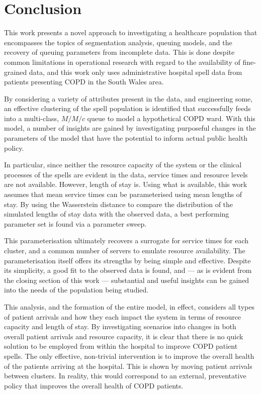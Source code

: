 \section{Conclusion}\label{sec:conclusion}

This work presents a novel approach to investigating a healthcare population
that encompasses the topics of segmentation analysis, queuing models, and the
recovery of queuing parameters from incomplete data. This is done despite common
limitations in operational research with regard to the availability of
fine-grained data, and this work only uses administrative hospital spell data
from patients presenting COPD in the South Wales area.\

By considering a variety of attributes present in the data, and engineering
some, an effective clustering of the spell population is identified that
successfully feeds into a multi-class, \(M/M/c\) queue to model a hypothetical
COPD ward. With this model, a number of insights are gained by investigating
purposeful changes in the parameters of the model that have the potential to
inform actual public health policy.

In particular, since neither the resource capacity of the system or the clinical
processes of the spells are evident in the data, service times and resource
levels are not available. However, length of stay is. Using what is available,
this work assumes that mean service times can be parameterised using mean
lengths of stay. By using the Wasserstein distance to compare the distribution
of the simulated lengths of stay data with the observed data, a best performing
parameter set is found via a parameter sweep.

This parameterisation ultimately recovers a surrogate for service times for each
cluster, and a common number of servers to emulate resource availability. The
parameterisation itself offers its strengths by being simple and effective.
Despite its simplicity, a good fit to the observed data is found, and --- as is
evident from the closing section of this work --- substantial and useful
insights can be gained into the needs of the population being studied.

This analysis, and the formation of the entire model, in effect, considers all
types of patient arrivals and how they each impact the system in terms of
resource capacity and length of stay. By investigating scenarios into changes in
both overall patient arrivals and resource capacity, it is clear that there is
no quick solution to be employed from within the hospital to improve COPD
patient spells.  The only effective, non-trivial intervention is to improve the
overall health of the patients arriving at the hospital. This is shown by moving
patient arrivals between clusters. In reality, this would correspond to an
external, preventative policy that improves the overall health of COPD patients.
